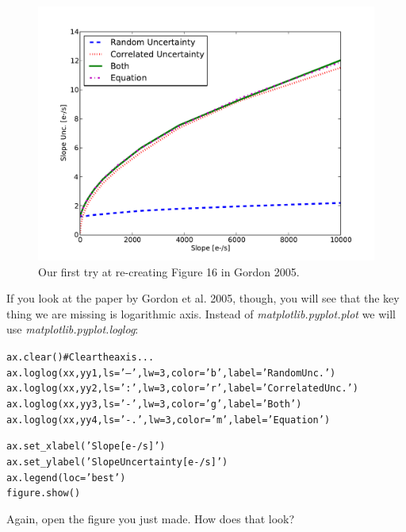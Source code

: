 \begin{figure}[tbp]
  \centering
    \includegraphics[scale=0.55]{splot.pdf}
    \caption{Our first try at re-creating Figure 16 in Gordon 2005.}
  \label{fig:splot}
\end{figure}

If you look at the paper by
Gordon et al. 2005, though, you will see that the key thing we are missing is
logarithmic axis.  Instead of \textit{matplotlib.pyplot.plot} we will use \textit{matplotlib.pyplot.loglog}:

\begin{alltt}
\pytab ax.clear()      # Clear the axis...
\pytab ax.loglog(xx, yy1, ls='--', lw=3, color='b', label='Random Unc.')
\pytab ax.loglog(xx, yy2, ls=':', lw=3, color='r', label='Correlated Unc.')
\pytab ax.loglog(xx, yy3, ls='-', lw=3, color='g', label='Both')
\pytab ax.loglog(xx, yy4, ls='-.', lw=3, color='m', label='Equation')

\pytab ax.set_xlabel('Slope [e-/s]')
\pytab ax.set_ylabel('Slope Uncertainty [e-/s]')
\pytab ax.legend(loc='best')
\pytab figure.show()
\end{alltt}

Again, open the figure you just made.  How does that look?  

